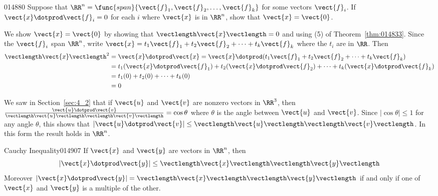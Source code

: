 \begin{example}{}{014880}
Suppose that $\RR^n = \func{span}\{\vect{f}_{1}, \vect{f}_{2}, \dots, \vect{f}_{k}\}$ for some vectors $\vect{f}_{i}$. If $\vect{x} \dotprod \vect{f}_{i} = 0$ for each $i$ where $\vect{x}$ is in $\RR^n$, show that $\vect{x} = \vect{0}$.

\begin{solution}
We show $\vect{x} = \vect{0}$ by showing that $\vectlength\vect{x}\vectlength = 0$ and using (5) of Theorem~\ref{thm:014833}. Since the $\vect{f}_{i}$ span $\RR^n$, write $\vect{x} = t_{1}\vect{f}_{1} + t_{2}\vect{f}_{2} + \dots + t_{k}\vect{f}_{k}$ where the $t_{i}$ are in $\RR$. Then
\begin{align*}
\vectlength\vect{x}\vectlength^2 &= \vect{x} \dotprod \vect{x} = \vect{x} \dotprod (t_1\vect{f}_1 + t_2\vect{f}_2 + \dots + t_k\vect{f}_k) \\
&= t_1(\vect{x} \dotprod \vect{f}_1) + t_2(\vect{x} \dotprod \vect{f}_2) + \dots + t_k(\vect{x} \dotprod \vect{f}_k) \\
&= t_1(0) + t_2(0) + \cdots + t_k(0) \\
&= 0
\end{align*}
\end{solution}
\end{example}

\noindent We saw in Section~\ref{sec:4_2} that if $\vect{u}$ and $\vect{v}$ are nonzero vectors in $\RR^3$, then $\frac{\vect{u} \dotprod \vect{v}}{\vectlength\vect{u}\vectlength \vectlength\vect{v}\vectlength} = \cos\theta$ where $\theta$ is the angle between $\vect{u}$ and $\vect{v}$. Since $|\cos \theta| \leq 1$ for any angle $\theta$, this shows that $|\vect{u} \dotprod \vect{v}| \leq \vectlength\vect{u}\vectlength\vectlength\vect{v}\vectlength$. In this form the result holds in $\RR^n$.

\begin{theorem}{Cauchy Inequality\footnotemark}{014907} %
If $\vect{x}$ and $\vect{y}$ are vectors in $\RR^n$, then
\begin{equation*}
| \vect{x} \dotprod \vect{y}| \leq \vectlength\vect{x}\vectlength \vectlength\vect{y}\vectlength 
\end{equation*}
Moreover $|\vect{x} \dotprod \vect{y}| = \vectlength\vect{x}\vectlength \vectlength\vect{y}\vectlength$ if and only if one of $\vect{x}$ and $\vect{y}$ is a multiple of the other.
\end{theorem}

